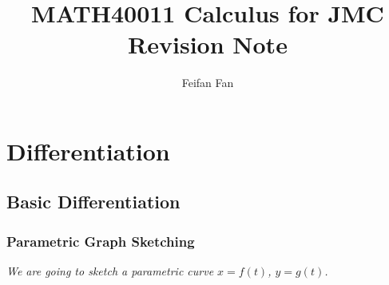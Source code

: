 \documentclass[12pt]{report}
\title{MATH40011 Calculus for JMC 
 \\ Revision Note}
\author{Feifan Fan}
\begin{document}
\maketitle
\tableofcontents

\chapter{Differentiation}

\section{Basic Differentiation}

\subsection{Parametric Graph Sketching}

\emph{We are going to sketch a parametric curve $x = f(t)$, $y = g(t)$.}
\newline
\end{document}
